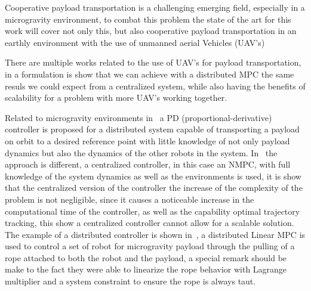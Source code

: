 Cooperative payload transportation is a challenging emerging field, especially in a microgravity environment, to combat this problem the state of the art for this work will cover not only this, but also cooperative payload transportation in an earthly environment with the use of unmanned aerial Vehicles (UAV's)

There are multiple works related to the use of UAV's for payload transportation, in \cite{9341541} a formulation is show that we can achieve with a distributed MPC the same resuls we could expect from a centralized system, while also having the benefits of scalability for a problem with more UAV's working together. 

Related to microgravity environments in~\cite{9438133} a PD (proportional-derivative) controller is proposed for a distributed system capable of transporting a payload on orbit to a desired reference point with little knowledge of not only payload dynamics but also the dynamics of the other robots in the system. In~\cite{9429795} the approach is different, a centralized controller, in this case an NMPC, with full knowledge of the system dynamics as well as the environments is used, it is show that the centralized version of the controller the increase of the complexity of the problem is not negligible, since it causes a noticeable increase in the computational time of the controller, as well as the capability optimal trajectory tracking, this show  a centralized controller cannot allow for a scalable solution. The example of a distributed controller is shown in~\cite{phodapol2024collaborative}, a distributed Linear MPC is used to control a set of robot for microgravity payload through the pulling of a rope attached to both the robot and the payload, a special remark should be make to the fact they were able to linearize the rope behavior with Lagrange multiplier and a system constraint to ensure the rope is always taut.